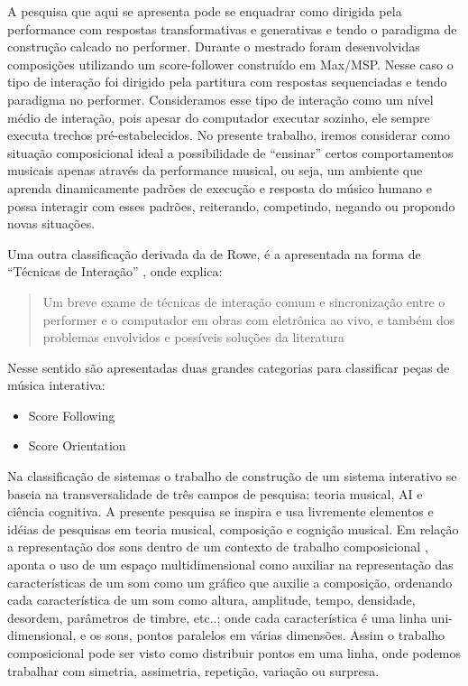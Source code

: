 \documentclass[draft]{ppgmus}
\begin{document}
A pesquisa que aqui se apresenta pode se enquadrar como dirigida pela
performance com respostas transformativas e generativas e tendo o
paradigma de construção calcado no performer. Durante o mestrado foram
desenvolvidas composições utilizando um score-follower construído em
Max/MSP. Nesse caso o tipo de interação foi dirigido pela partitura
com respostas sequenciadas e tendo paradigma no performer.
Consideramos esse tipo de interação como um nível médio de interação,
pois apesar do computador executar sozinho, ele sempre executa trechos
pré-estabelecidos. No presente trabalho, iremos considerar como
situação composicional ideal a possibilidade de “ensinar” certos
comportamentos musicais apenas através da performance musical, ou
seja, um ambiente que aprenda dinamicamente padrões de execução e
resposta do músico humano e possa interagir com esses padrões,
reiterando, competindo, negando ou propondo novas situações.

Uma outra classificação derivada da de Rowe, é a apresentada na forma
de ``Técnicas de Interação'' \cite{pestova:tese}, onde  explica:
\begin{quote}
 Um breve exame de técnicas de interação comum e sincronização entre o
performer e o computador em obras com eletrônica ao vivo, e também dos problemas
envolvidos e possíveis soluções da literatura
\end{quote} 

Nesse sentido são apresentadas duas grandes categorias para classificar peças
de música interativa:

\begin{itemize}
 \item Score Following
  \item Score Orientation
\end{itemize}








Na classificação de sistemas \cite{rowe93:interactive} o trabalho de construção de um sistema interativo se
baseia na transversalidade de  três campos de pesquisa: teoria
musical, AI e ciência cognitiva. A presente pesquisa se inspira e usa
livremente elementos e idéias de pesquisas em teoria musical,
composição e cognição musical. Em relação a representação dos sons
dentro de um contexto de trabalho composicional \cite{xenakis96:determinacy}, aponta o
uso de um espaço multidimensional como auxiliar na representação das
características de um som como um gráfico que auxilie a composição,
ordenando cada característica de um som  como altura, amplitude,
tempo, densidade, desordem, parâmetros de timbre, etc..; onde cada
característica é uma linha uni-dimensional, e os sons, pontos
paralelos em várias dimensões. Assim o trabalho composicional pode ser
visto como distribuir pontos em uma linha, onde podemos trabalhar com
simetria, assimetria, repetição, variação ou surpresa.
\end{document}
